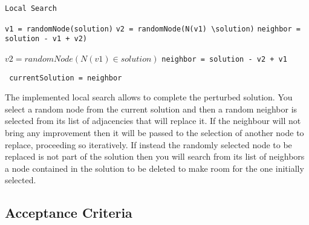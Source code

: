 \documentclass[11pt, oneside]{article}
\begin{document}
\qquad

\qquad

\qquad

\qquad

\pagebreak

\begin{algorithm}
    \caption{\texttt{Local Search}}
    \begin{algorithmic}
       		 \State \texttt{v1 = randomNode(solution)}
        		   		\State \texttt{v2 = randomNode(N(v1) \textbackslash  solution)}
        		   			\State \texttt{neighbor = solution - v1 + v2)}
				\EndIf{}
		 
		  \Else{\texttt{}}
			\State \texttt{$v2 = randomNode(N(v1) \in  solution)$}
        		   			\State \texttt{neighbor = solution - v2 + v1}
				\EndIf{}
			
		 \EndIf{}
        		   			\State \texttt{ currentSolution = neighbor}
		  \EndIf{}	

	\EndFor{}
    \end{algorithmic}
    \end{algorithm}

\qquad

\qquad

\qquad


The implemented local search allows to complete the perturbed solution. You select a random node from the current solution and then a random neighbor is selected from its list of adjacencies that will replace it. If the neighbour will not bring any improvement then it will be passed to the selection of another node to replace, proceeding so iteratively. If instead the randomly selected node to be replaced is not part of the solution then you will search from its list of neighbors a node contained in the solution to be deleted to make room for the one initially selected.



\pagebreak

\subsection{Acceptance Criteria}

\qquad

\qquad
\end{document}
